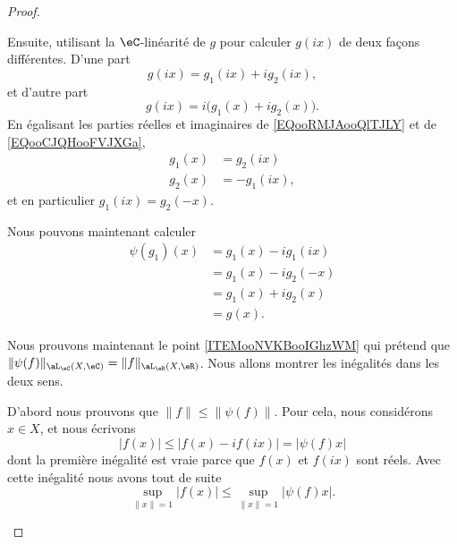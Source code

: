 \begin{proof}
\begin{subproof}
		Ensuite, utilisant la \( \eC\)-linéarité de \( g\) pour calculer \( g(ix)\) de deux façons différentes. D'une part
		\begin{equation}        \label{EQooRMJAooQlTJLY}
			g(ix)=g_1(ix)+ig_2(ix),
		\end{equation}
		et d'autre part
		\begin{equation}        \label{EQooCJQHooFVJXGa}
			g(ix)=i\big( g_1(x)+ig_2(x) \big).
		\end{equation}
		En égalisant les parties réelles et imaginaires de \eqref{EQooRMJAooQlTJLY} et de \eqref{EQooCJQHooFVJXGa},
		\begin{subequations}
			\begin{align}
				g_1(x) & =g_2(ix)   \\
				g_2(x) & =-g_1(ix),
			\end{align}
		\end{subequations}
		et en particulier \( g_1(ix)=g_2(-x)\).

		Nous pouvons maintenant calculer
		\begin{subequations}
			\begin{align}
				\psi(g_1)(x) & =g_1(x)-ig_1(ix) \\
				             & =g_1(x)-ig_2(-x) \\
				             & =g_1(x)+ig_2(x)  \\
				             & =g(x).
			\end{align}
		\end{subequations}

		\spitem[Norme]
		Nous prouvons maintenant le point \ref{ITEMooNVKBooIGhzWM} qui prétend que \( \| \psi(f) \|_{\aL_{\eC}(X,\eC)}=\| f \|_{\aL_{\eR}(X,\eR)}\). Nous allons montrer les inégalités dans les deux sens.

		\begin{subproof}

			D'abord nous prouvons que \( \| f \|\leq \| \psi(f) \|\). Pour cela, nous considérons \( x\in X\), et nous écrivons
			\begin{equation}
				| f(x) |\leq | f(x)-if(ix) |=| \psi(f)x |
			\end{equation}
			dont la première inégalité est vraie parce que \( f(x)\) et \( f(ix)\) sont réels. Avec cette inégalité nous avons tout de suite
			\begin{equation}
				\sup_{\| x \|=1}| f(x) |\leq \sup_{\| x \|=1}| \psi(f)x |.
			\end{equation}


\end{subproof}
\end{subproof}
\end{proof}
